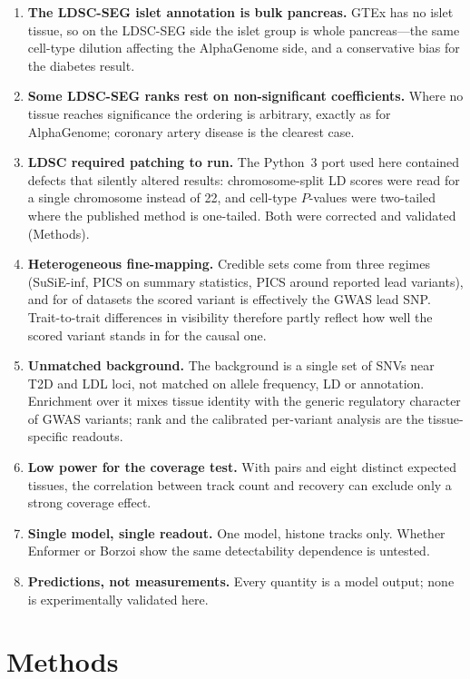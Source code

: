 \documentclass[11pt]{article}
\begin{document}
\begin{enumerate}
\item \textbf{The LDSC-SEG islet annotation is bulk pancreas.} GTEx has no islet tissue,
so on the LDSC-SEG side the islet group is whole pancreas---the same cell-type dilution
affecting the AlphaGenome side, and a conservative bias for the diabetes result.
\item \textbf{Some LDSC-SEG ranks rest on non-significant coefficients.} Where no tissue
reaches significance the ordering is arbitrary, exactly as for AlphaGenome; coronary
artery disease is the clearest case.
\item \textbf{LDSC required patching to run.} The Python~3 port used here contained
defects that silently altered results: chromosome-split LD scores were read for a single
chromosome instead of 22, and cell-type $P$-values were two-tailed where the published
method is one-tailed. Both were corrected and validated (Methods).
\item \textbf{Heterogeneous fine-mapping.} Credible sets come from three regimes
(SuSiE-inf, PICS on summary statistics, PICS around reported lead variants), and for
\NPICSTOP{} of \NTRAITS{} datasets the scored variant is effectively the GWAS lead SNP.
Trait-to-trait differences in visibility therefore partly reflect how well the scored
variant stands in for the causal one.
\item \textbf{Unmatched background.} The background is a single set of \NBG{} SNVs near
T2D and LDL loci, not matched on allele frequency, LD or annotation. Enrichment over it
mixes tissue identity with the generic regulatory character of GWAS variants; rank and
the calibrated per-variant analysis are the tissue-specific readouts.
\item \textbf{Low power for the coverage test.} With \NTRAITS{} pairs and eight distinct
expected tissues, the correlation between track count and recovery can exclude only a
strong coverage effect.
\item \textbf{Single model, single readout.} One model, histone tracks only. Whether
Enformer or Borzoi show the same detectability dependence is untested.
\item \textbf{Predictions, not measurements.} Every quantity is a model output; none is
experimentally validated here.
\end{enumerate}

\section{Methods}
\end{document}
